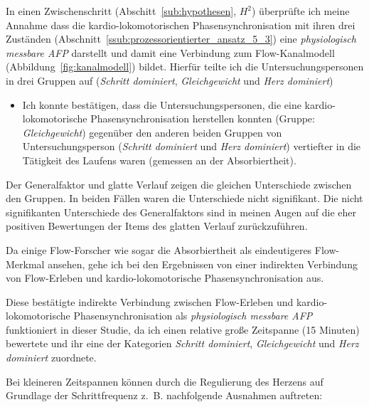 In einen Zwischenschritt (Abschitt~\ref{sub:hypothesen}, $H^2$) überprüfte ich meine Annahme dass die kardio-lokomotorischen Phasensynchronisation mit ihren drei Zuständen (Abschnitt~\ref{ssub:prozessorientierter_ansatz_5_3}) eine \emph{physiologisch messbare \ac{AFP}} darstellt und damit eine Verbindung zum Flow-Kanalmodell (Abbildung~\ref{fig:kanalmodell}) bildet. Hierfür teilte ich die Untersuchungspersonen in drei Gruppen auf (\emph{Schritt dominiert}, \emph{Gleichgewicht} und \emph{Herz dominiert})

\begin{itemize}

	\item Ich konnte bestätigen, dass die Untersuchungspersonen, die eine kardio-lokomotorische Phasensynchronisation herstellen konnten (Gruppe: \emph{Gleichgewicht}) gegenüber den anderen beiden Gruppen von Untersuchungsperson (\emph{Schritt dominiert} und \emph{Herz dominiert}) vertiefter in die Tätigkeit des Laufens waren (gemessen an der Absorbiertheit).

\end{itemize}


Der Generalfaktor und glatte Verlauf zeigen die gleichen Unterschiede zwischen den Gruppen. In beiden Fällen waren die Unterschiede nicht signifikant. Die nicht signifikanten Unterschiede des Generalfaktors sind in meinen Augen auf die eher positiven Bewertungen der Items des glatten Verlauf zurückzuführen. 

Da einige Flow-Forscher wie \cite{Peifer2014} sogar die Absorbiertheit als eindeutigeres Flow-Merkmal ansehen, gehe ich bei den Ergebnissen von einer indirekten Verbindung von Flow-Erleben und kardio-lokomotorische Phasensynchronisation aus. 

Diese bestätigte indirekte Verbindung zwischen Flow-Erleben und kardio-lokomotorische Phasensynchronisation als \emph{physiologisch messbare \ac{AFP}} funktioniert in dieser Studie, da ich einen relative große Zeitspanne (15 Minuten) bewertete und ihr eine der Kategorien \emph{Schritt dominiert}, \emph{Gleichgewicht} und \emph{Herz dominiert} zuordnete.

Bei kleineren Zeitspannen können durch die Regulierung des Herzens auf Grundlage der Schrittfrequenz z.~B. nachfolgende Ausnahmen auftreten: 

